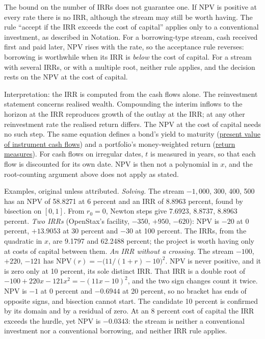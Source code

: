 \begin{qfmethod}
 The bound on the number of IRRs does not guarantee one. If NPV is positive at every rate there is no IRR, although the stream may still be worth having. The rule ``accept if the IRR exceeds the cost of capital'' applies only to a conventional investment, as described in Notation. For a borrowing-type stream, cash received first and paid later, NPV rises with the rate, so the acceptance rule reverses: borrowing is worthwhile when its IRR is \emph{below} the cost of capital. For a stream with several IRRs, or with a multiple root, neither rule applies, and the decision rests on the NPV at the cost of capital.

Interpretation: the IRR is computed from the cash flows alone. The reinvestment statement concerns realised wealth. Compounding the interim inflows to the horizon at the IRR reproduces growth of the outlay at the IRR; at any other reinvestment rate the realised return differs. The NPV at the cost of capital needs no such step. The same equation defines a bond's yield to maturity (\hyperref[meth:instrument-present-value]{present value of instrument cash flows}) and a portfolio's money-weighted return (\hyperref[def:return-measures]{return measures}). For cash flows on irregular dates, $t$ is measured in years, so that each flow is discounted for its own date. NPV is then not a polynomial in $x$, and the root-counting argument above does not apply as stated.

 Examples, original unless attributed. \emph{Solving.} The stream $-1{,}000$, 300, 400, 500 has an NPV of 58.8271 at 6 percent and an IRR of 8.8963 percent, found by bisection on $[0,1]$. From $r_0=0$, Newton steps give 7.6923, 8.8737, 8.8963 percent. \emph{Two IRRs} (OpenStax's facility, $-350$, $+950$, $-620$): NPV is $-20$ at 0 percent, $+13.9053$ at 30 percent and $-30$ at 100 percent. The IRRs, from the quadratic in $x$, are 9.1797 and 62.2488 percent; the project is worth having only at costs of capital between them. \emph{An IRR without a crossing.} The stream $-100$, $+220$, $-121$ has $\mathrm{NPV}(r)=-\bigl(11/(1+r)-10\bigr)^2$. NPV is never positive, and it is zero only at 10 percent, its sole distinct IRR. That IRR is a double root of $-100+220x-121x^2=-(11x-10)^2$, and the two sign changes count it twice. NPV is $-1$ at 0 percent and $-0.6944$ at 20 percent, so no bracket has ends of opposite signs, and bisection cannot start. The candidate 10 percent is confirmed by its domain and by a residual of zero. At an 8 percent cost of capital the IRR exceeds the hurdle, yet NPV is $-0.0343$: the stream is neither a conventional investment nor a conventional borrowing, and neither IRR rule applies.


\end{qfmethod}
